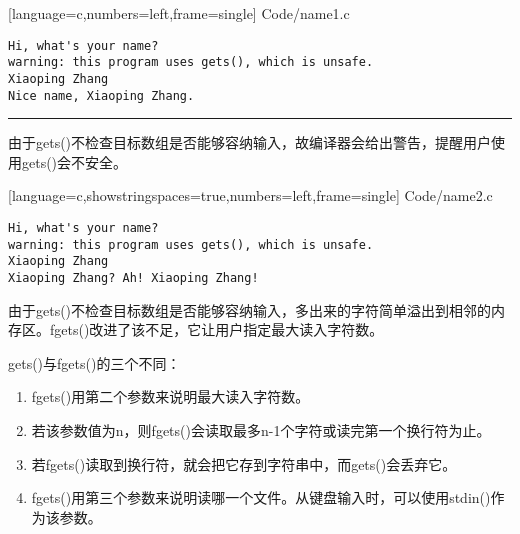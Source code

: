 \begin{frame}[fragile] 

[language=c,numbers=left,frame=single]
{Code/name1.c}
\end{frame}

\begin{frame}[fragile] 
\begin{lstlisting}[]
Hi, what's your name?
warning: this program uses gets(), which is unsafe.
Xiaoping Zhang
Nice name, Xiaoping Zhang.
\end{lstlisting}

\rule{\textwidth}{0.3mm} \pause \vspace{.1in}
由于{\tf gets()}不检查目标数组是否能够容纳输入，故编译器会给出警告，提醒用户使用{\tf gets()}会不安全。
\end{frame}

\begin{frame}[fragile] 

[language=c,showstringspaces=true,numbers=left,frame=single]
{Code/name2.c}
\end{frame}

\begin{frame}[fragile] 
\begin{lstlisting}[]
Hi, what's your name?
warning: this program uses gets(), which is unsafe.
Xiaoping Zhang
Xiaoping Zhang? Ah! Xiaoping Zhang!
\end{lstlisting}
\end{frame}


\begin{frame}[fragile] 
由于{\tf gets()}不检查目标数组是否能够容纳输入，多出来的字符简单溢出到相邻的内存区。{\tf fgets()}改进了该不足，它让用户指定最大读入字符数。
\end{frame}

\begin{frame}[fragile] 
{\tf gets()}与{\tf fgets()}的三个不同：
\begin{enumerate}
\item {\tf fgets()}用第二个参数来说明最大读入字符数。
\item[] 若该参数值为{\tf n}，则{\tf fgets()}会读取最多{\tf n-1}个字符或读完第一个换行符为止。\\[0.1in]
\item 若{\tf fgets()}读取到换行符，就会把它存到字符串中，而{\tf gets()}会丢弃它。\\[0.1in]
\item {\tf fgets()}用第三个参数来说明读哪一个文件。从键盘输入时，可以使用{\tf stdin()}作为该参数。
\end{enumerate}
\end{frame}

